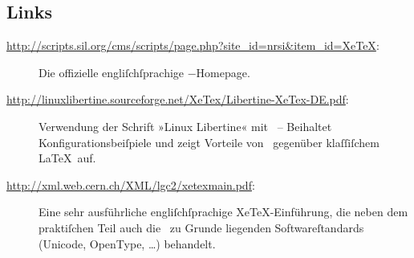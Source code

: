 ﻿\documentclass{scrartcl}
\begin{document}
\subsection*{Links}
\begin{description}
\item[\url{http://scripts.sil.org/cms/scripts/page.php?site_id=nrsi&item_id=XeTeX}:] Die offizielle engliſchſprachige \XeTeX−Homepage.
\item[\url{http://linuxlibertine.sourceforge.net/XeTex/Libertine-XeTex-DE.pdf}:] Verwendung der Schrift »Linux Libertine« mit \XeTeX\ – Beihaltet Konfigurationsbeiſpiele und zeigt Vorteile von \XeTeX\ gegenüber klaſſiſchem \LaTeX\ auf.
\item[\url{http://xml.web.cern.ch/XML/lgc2/xetexmain.pdf}:] Eine sehr ausführliche engliſchſprachige XeTeX-Einführung, die neben dem praktiſchen Teil auch die \XeTeX\ zu Grunde liegenden Softwareſtandards (Unicode, OpenType, …) behandelt.
\end{description}



\end{document}

